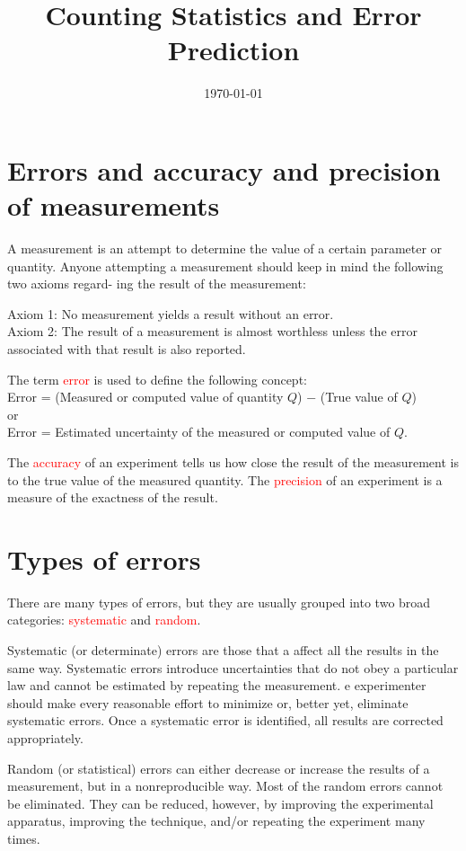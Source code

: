 \documentclass[12pt,a4paper]{article}
\title{Counting Statistics and Error Prediction}
\author{}
\date{\today}
\begin{document}
\maketitle

\section{Errors and accuracy and precision of measurements}
A measurement is an attempt to determine the value of a certain parameter or quantity. Anyone attempting a measurement should keep in mind the following two axioms regard- ing the result of the measurement:

Axiom 1: No measurement yields a result without an error. \\
Axiom 2: The result of a measurement is almost worthless unless the error associated with that result is also reported.

The term \textcolor{red}{error} is used to define the following concept:\\
Error = (Measured or computed value of quantity $Q$) − (True value of $Q$) \\
or \\
Error = Estimated uncertainty of the measured or computed value of $Q$.

The \textcolor{red}{accuracy} of an experiment tells us how close the result of the measurement is to the true value of the measured quantity. The \textcolor{red}{precision} of an experiment is a measure of the exactness of the result.

\section{Types of errors}
There are many types of errors, but they are usually grouped into two broad categories: \textcolor{red}{systematic} and  \textcolor{red}{random}.
 
Systematic (or determinate) errors are those that a affect all the results in the same way. Systematic errors introduce uncertainties that do not obey a particular law and cannot be estimated by repeating the measurement.  e experimenter should make every reasonable effort to minimize or, better yet, eliminate systematic errors. Once a systematic error is identified, all results are corrected appropriately.

Random (or statistical) errors can either decrease or increase the results of a measurement, but in a nonreproducible way. Most of the random errors cannot be eliminated. They can be reduced, however, by improving the experimental apparatus, improving the technique, and/or repeating the experiment many times. 
\end{document}
